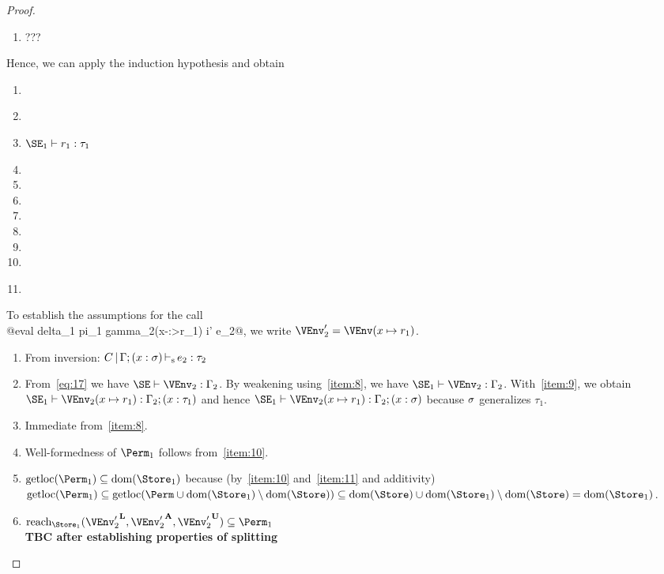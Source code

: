 \begin{proof}
\begin{enumerate}[({A1-}1)]
  \item ???
  \end{enumerate}
  Hence, we can apply the induction hypothesis and obtain
  \begin{enumerate}[({R1-}1)]
  \item {}
  \item\label{item:8} 
  \item\label{item:9} $\SE_1 \vdash r_1 : \tau_1$
  \item {}
  \item {} 
  \item {} 
  \item {} 
  \item {}
  \item {} 
  \item {}
  \item\label{item:10} 
  \end{enumerate}
  To establish the assumptions for the call \\
  @eval delta_1 pi_1 gamma_2(x-:>r_1) i' e_2@,
  we write $\VEnv_2' = \VEnv (x \mapsto r_1)$.
  \begin{enumerate}[({A2-}1)]
  \item From inversion: $C \operatorname{|} \Gamma;(x : \sigma) \operatorname{\vdash_s} e_2 : \tau_2$
  \item From~\eqref{eq:17} we have $\SE \vdash \VEnv_2 : \E_2$.
    By weakening using~\ref{item:8}, we have
    $\SE_1 \vdash \VEnv_2 : \E_2$.
    With~\ref{item:9}, we obtain
    $\SE_1 \vdash \VEnv_2 (x \mapsto r_1 ) : \E_2;\bvar x {\tau_1}$
    and hence
    $\SE_1 \vdash \VEnv_2 (x \mapsto r_1 ) : \E_2;\bvar x {\schm}$
    because $\sigma$ generalizes $\tau_1$.
  \item Immediate from~\ref{item:8}.
  \item Well-formedness of $\Perm_1$ follows from~\ref{item:10}.
  \item $\Rawloc{\Perm_1} \subseteq \Dom{\Store_1}$ because
    (by~\ref{item:10} and~\ref{item:11} and additivity) 
    $\Rawloc{\Perm_1} \subseteq \Rawloc{\Perm \cup \Dom{\Store_1}
      \setminus \Dom\Store} \subseteq \Dom\Store \cup \Dom{\Store_1}
    \setminus \Dom\Store = \Dom{\Store_1}$. 
  \item $\Reach{\Store_1}{\Active{\VEnv_2'}, \MutableBorrows{\VEnv_2'},
      \ImmutableBorrows{\VEnv_2'}} \subseteq \Perm_1$
    \\\textbf{TBC after establishing properties of splitting}
  \end{enumerate}
\end{proof}

